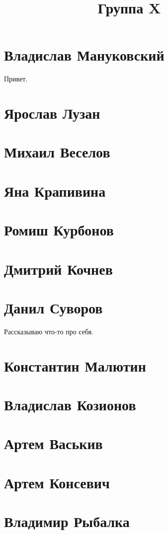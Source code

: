 \documentclass{article}
\title{Группа X}
\begin{document}
\section*{Владислав Мануковский}
Привет.
\section*{Ярослав Лузан}

\section*{Михаил Веселов}

\section*{Яна Крапивина}

\section*{Ромиш Курбонов}

\section*{Дмитрий Кочнев}

\section*{Данил Суворов}
Рассказываю что-то про себя.
\section*{Константин Малютин}

\section*{Владислав Козионов}

\section*{Артем Васькив}

\section*{Артем Консевич}

\section*{Владимир Рыбалка}
\end{document}
